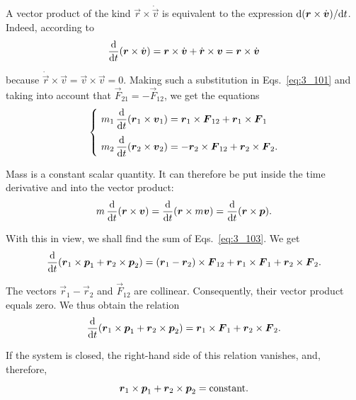A vector product of the kind $\vec{r}\times\dot{\vec{v}}$ is equivalent to the expression $\mathrm{d}(\boldsymbol{r}\times\dot{\boldsymbol{v}})/\mathrm{d} t$. Indeed, according to 
\begin{equation}\label{eq:3_102}
\frac{\mathrm{d}}{\mathrm{d} t}(\boldsymbol{r}\times\dot{\boldsymbol{v}}) = \boldsymbol{r}\times\dot{\boldsymbol{v}} + \dot{\boldsymbol{r}}\times\boldsymbol{v} = \boldsymbol{r}\times\dot{\boldsymbol{v}}
\end{equation}

\noindent
because $\dot{\vec{r}}\times\vec{v}=\vec{v}\times\vec{v}=0$. Making such a substitution in Eqs.~\eqref{eq:3_101} and taking into account that $\vec{F}_{21}=-\vec{F}_{12}$, we get the equations
\begin{equation}\label{eq:3_103}
\begin{cases}
& \!\!\!\! m_1\,\dfrac{\upd}{\deriv{t}}(\vec{r}_1\times\vec{v}_1) = \vecprodind{r}{1}{F}{12} + \vecprodind{r}{1}{F}{1}\\[10pt]
& \!\!\!\! m_2\,\dfrac{\upd}{\deriv{t}}(\vec{r}_2\times\vec{v}_2) = - \vecprodind{r}{2}{F}{12} + \vecprodind{r}{2}{F}{2}.
\end{cases}
\end{equation}

Mass is a constant scalar quantity. It can therefore be put inside the time derivative and into the vector product:
\begin{equation*}
m\,\frac{\mathrm{d}}{\mathrm{d} t}(\boldsymbol{r}\times\boldsymbol{v}) = \frac{\mathrm{d}}{\mathrm{d} t}(\boldsymbol{r}\times m\boldsymbol{v}) = \frac{\mathrm{d}}{\mathrm{d} t}(\boldsymbol{r}\times\boldsymbol{p}).
\end{equation*}

\noindent
With this in view, we shall find the sum of Eqs.~\eqref{eq:3_103}. We get
\begin{equation*}
\frac{\mathrm{d}}{\mathrm{d} t}(\boldsymbol{r}_{1}\times\boldsymbol{p}_{1} + \boldsymbol{r}_{2}\times\boldsymbol{p}_{2}) = (\boldsymbol{r}_1-\boldsymbol{r}_2)\times\boldsymbol{F}_{12} + \boldsymbol{r}_{1}\times\boldsymbol{F}_{1} + \boldsymbol{r}_{2}\times\boldsymbol{F}_{2}.
\end{equation*}

\noindent
The vectors $\vec{r}_1-\vec{r}_2$ and $\vec{F}_{12}$ are collinear. Consequently, their vector product equals zero. We thus obtain the relation
\begin{equation}\label{eq:3_104}
\frac{\mathrm{d}}{\mathrm{d} t}(\boldsymbol{r}_{1}\times\boldsymbol{p}_{1} + \boldsymbol{r}_{2}\times\boldsymbol{p}_{2}) = \boldsymbol{r}_{1}\times\boldsymbol{F}_{1} + \boldsymbol{r}_{2}\times\boldsymbol{F}_{2}.
\end{equation}

\noindent
If the system is closed, the right-hand side of this relation vanishes, and, therefore,
\begin{equation*}
\boldsymbol{r}_{1}\times\boldsymbol{p}_{1} + \boldsymbol{r}_{2}\times\boldsymbol{p}_{2} = \text{constant}.
\end{equation*}

